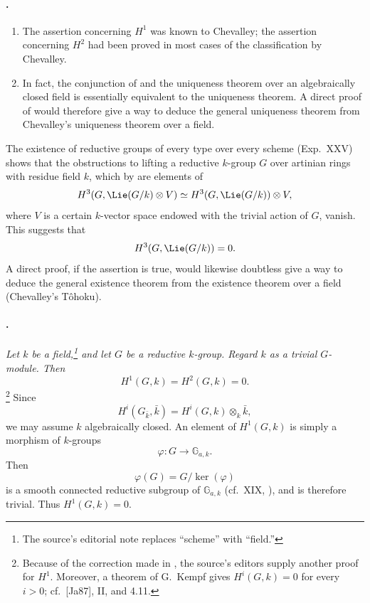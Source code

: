 \paragraph{.}
\begin{enumerate}
\item[(i)] The assertion concerning \(H^1\) was known to Chevalley;
the assertion concerning \(H^2\) had been proved in most cases of
the classification by Chevalley.
\item[(ii)] In fact, the conjunction of  and the
uniqueness theorem over an algebraically closed field is essentially
equivalent to the uniqueness theorem. A direct proof of
 would therefore give a way to deduce the general
uniqueness theorem from Chevalley's uniqueness theorem over a field.
\end{enumerate}

The existence of reductive groups of every type over every scheme
\textup{(Exp.~XXV)} shows that the obstructions to lifting a
reductive \(k\)-group \(G\) over artinian rings with residue field
\(k\), which by  are elements of
\[
  H^3(G,\Lie(G/k)\otimes V)
  \simeq H^3(G,\Lie(G/k))\otimes V,
\]
where \(V\) is a certain \(k\)-vector space endowed with the trivial
action of \(G\), vanish. This suggests that
\[
  H^3(G,\Lie(G/k))=0.
\]
A direct proof, if the assertion is true, would likewise doubtless
give a way to deduce the general existence theorem from the
existence theorem over a field \textup{(Chevalley's Tôhoku)}.

\paragraph{.}
\emph{Let \(k\) be a field,\footnote{The source's editorial note
replaces ``scheme'' with ``field.''} and let \(G\) be a reductive
\(k\)-group. Regard \(k\) as a trivial \(G\)-module. Then}
\[
  H^1(G,k)=H^2(G,k)=0.
\]
\footnote{Because of the correction made in , the source's
editors supply another proof for \(H^1\). Moreover, a theorem of
G.~Kempf gives \(H^i(G,k)=0\) for every \(i>0\); cf.\ [Ja87],
II,  and 4.11.}
Since
\[
  H^i(G_{\bar k},\bar k)=H^i(G,k)\otimes_k\bar k,
\]
we may assume \(k\) algebraically closed. An element of \(H^1(G,k)\)
is simply a morphism of \(k\)-groups
\[
  \varphi:G\longrightarrow\mathbb G_{a,k}.
\]
Then
\[
  \varphi(G)=G/\ker(\varphi)
\]
is a smooth connected reductive subgroup of
\(\mathbb G_{a,k}\) \textup{(cf.\ XIX, )}, and is therefore
trivial. Thus \(H^1(G,k)=0\).

